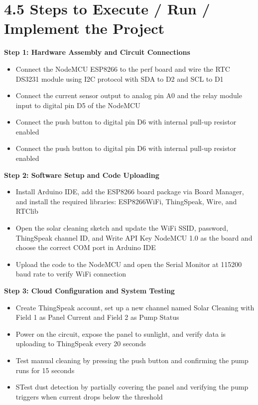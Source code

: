 \documentclass[10pt]{report}
\begin{document}
\begin{sloppypar}
{{{\begin{sloppypar}
\section{4.5  Steps to Execute / Run / Implement the Project}

\textbf{Step 1: Hardware Assembly and Circuit Connections}
\begin{itemize}
    \item Connect the NodeMCU ESP8266 to the perf board and wire the RTC DS3231
module using I2C protocol with SDA to D2 and SCL to D1
    \item  Connect the current sensor output to analog pin A0 and the relay module input
to digital pin D5 of the NodeMCU
    \item  Connect the push button to digital pin D6 with internal pull-up resistor enabled
    \item  Connect the push button to digital pin D6 with internal pull-up resistor enabled
\end{itemize}
\textbf{Step 2: Software Setup and Code Uploading}
\hspace{0.5cm}
\begin{itemize}
    \item  Install Arduino IDE, add the ESP8266 board package via Board Manager, and
install the required libraries: ESP8266WiFi, ThingSpeak, Wire, and RTClib
    \item Open the solar cleaning sketch and update the WiFi SSID, password, ThingSpeak channel ID, and Write API Key NodeMCU 1.0 as the board and choose the
correct COM port in Arduino IDE
    \item Upload the code to the NodeMCU and open the Serial Monitor at 115200 baud
rate to verify WiFi connection
\end{itemize}
\textbf{Step 3: Cloud Configuration and System Testing}
\hspace{0.5cm}
\begin{itemize}
    \item Create ThingSpeak account, set up a new channel named Solar Cleaning with
Field 1 as Panel Current and Field 2 as Pump Status
    \item Power on the circuit, expose the panel to sunlight, and verify data is uploading
to ThingSpeak every 20 seconds
    \item  Test manual cleaning by pressing the push button and confirming the pump runs
for 15 seconds
    \item  STest dust detection by partially covering the panel and verifying the pump triggers when current drops below the threshold

\end{itemize}
\end{sloppypar}}}}
\end{sloppypar}
\end{document}
